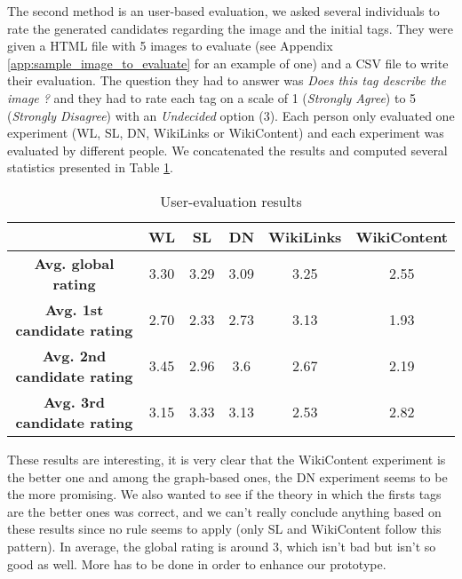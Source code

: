 The second method is an user-based evaluation, we asked several individuals to rate the generated candidates regarding the image and the initial tags. They were given a HTML file with 5 images to evaluate (see Appendix \ref{app:sample_image_to_evaluate} for an example of one) and a CSV file to write their evaluation. The question they had to answer was \emph{Does this tag describe the image ?} and they had to rate each tag on a scale of 1 (\emph{Strongly Agree}) to 5 (\emph{Strongly Disagree}) with an \emph{Undecided} option (3). Each person only evaluated one experiment (WL, SL, DN, WikiLinks or WikiContent) and each experiment was evaluated by different people. We concatenated the results and computed several statistics presented in Table \ref{table:userEval}.\\

\begin{table}[p]
\centering
\begin{tabular}{|c|c|c|c|c|c|}
\hline
{\bf } & {\bf WL} & {\bf SL} & {\bf DN} & {\bf WikiLinks} & {\bf WikiContent} \\ \hline
{\bf Avg.  global rating} & 3.30 & 3.29 & 3.09 & 3.25 & 2.55 \\ \hline
{\bf Avg. 1st candidate rating} & 2.70 & 2.33 & 2.73 & 3.13 & 1.93 \\ \hline
{\bf Avg. 2nd candidate rating} & 3.45 & 2.96 & 3.6 & 2.67 & 2.19 \\ \hline
{\bf Avg. 3rd candidate rating}  & 3.15 & 3.33 & 3.13 & 2.53 & 2.82 \\ \hline
\end{tabular}
\caption{User-evaluation results}
\label{table:userEval}
\end{table}
These results are interesting, it is very clear that the WikiContent experiment is the better one and among the graph-based ones, the DN experiment seems to be the more promising. We also wanted to see if the theory in which the firsts tags are the better ones was correct, and we can't really conclude anything based on these results since no rule seems to apply (only SL and WikiContent follow this pattern). In average, the global rating is around 3, which isn't bad but isn't so good as well. More has to be done in order to enhance our prototype.



